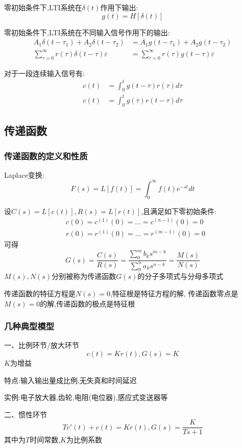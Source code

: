 \documentclass[12pt,a4paper,oneside]{ctexart}
\begin{document}
零初始条件下,LTI系统在$\delta(t)$作用下输出:
\[
    g(t) = H[\delta (t)]
\]

零初始条件下,LTI系统在不同输入信号作用下的输出:
\begin{align*}
    A_1\delta (t - \tau_1) + A_2\delta (t - \tau_2)&= A_1g(t - \tau_1) + A_2g(t - \tau_2)\\
    \sum_{\tau=0}^{\infty}r(\tau)\delta(t-\tau)\varepsilon &= \sum_{\tau=0}^{\infty}r(\tau)g(t-\tau)\varepsilon
\end{align*}

对于一段连续输入信号有:
\begin{align*}
    c(t) &= \int_{0}^{t}g(t-\tau)r(\tau)d\tau\\
    c(t) &= \int_{0}^{t}g(\tau)r(t-\tau)d\tau
\end{align*}

\subsection{传递函数}
\subsubsection{传递函数的定义和性质}
Laplace变换:
\[
    F(s) = L[f(t)] = \int_{0}^{\infty}f(t)e^{-st}dt
\]

设$C(s)=L[c(t)],R(s)=L[r(t)]$,且满足如下零初始条件:
\begin{align*}
    &c(0) = c^{(1)}(0) = ... = c^{(n-1)}(0) = 0\\
    &r(0) = r^{(1)}(0) = ... = r^{(m-1)}(0) = 0
\end{align*}
可得
\[
    G(s) = \frac{C(s)}{R(s)} = \frac{\sum_{0}^{m}b_ks^{m-k}}{\sum_{0}^{n}a_ks^{n-k}} = \frac{M(s)}{N(s)}
\]
$M(s),N(s)$分别被称为传递函数$G(s)$的分子多项式与分母多项式

传递函数的特征方程是$N(s)=0$,特征根是特征方程的解,
传递函数零点是$M(s)=0$的解,传递函数的极点是特征根

\subsubsection{几种典型模型}
一、比例环节/放大环节
\[
    c(t)=Kr(t),G(s)=K
\]
$K$为增益

特点:输入输出量成比例,无失真和时间延迟

实例:电子放大器,齿轮,电阻(电位器),感应式变送器等

二、惯性环节
\[
    Tc'(t) + c(t) = Kr(t),G(s) = \frac{K}{Ts+1}
\]
其中为$T$时间常数,$K$为比例系数
\end{document}
